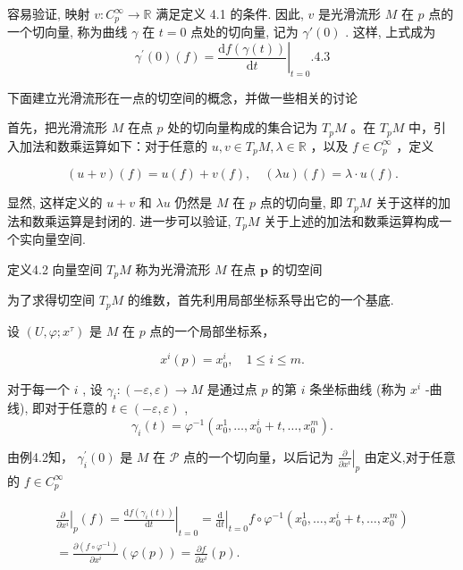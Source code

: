 容易验证, 映射  $v: C_p^\infty \to \mathbb{R}$  满足定义 4.1 的条件. 因此,  $v$  是光滑流形  $M$  在  $p$  点的一个切向量, 称为曲线  $\gamma$  在  $t = 0$  点处的切向量, 记为  $\gamma'(0)$ . 这样, 上式成为
$$
\gamma^ {\prime} (0) (f) = \left. \frac {\mathrm {d} f (\gamma (t))}{\mathrm {d} t} \right| _ {t = 0}. %
 {4.3}
$$

下面建立光滑流形在一点的切空间的概念，并做一些相关的讨论

首先，把光滑流形  $M$  在点  $p$  处的切向量构成的集合记为  $T_{p}M$ 。在  $T_{p}M$  中，引入加法和数乘运算如下：对于任意的  $u, v \in T_{p}M, \lambda \in \mathbb{R}$ ，以及  $f \in C_{p}^{\infty}$ ，定义

$$
(u + v) (f) = u (f) + v (f), \quad (\lambda u) (f) = \lambda \cdot u (f).
$$

显然, 这样定义的  $u + v$  和  $\lambda u$  仍然是  $M$  在  $p$  点的切向量, 即  $T_{p}M$  关于这样的加法和数乘运算是封闭的. 进一步可以验证,  $T_{p}M$  关于上述的加法和数乘运算构成一个实向量空间.

定义4.2 向量空间  $T_{p}M$  称为光滑流形  $M$  在点  $\pmb{p}$  的切空间

为了求得切空间  $T_{p}M$  的维数，首先利用局部坐标系导出它的一个基底.

设  $(U, \varphi; x^{\tau})$  是  $M$  在  $p$  点的一个局部坐标系，

$$
x ^ {i} (p) = x _ {0} ^ {i}, \quad 1 \leqslant i \leqslant m.
$$

对于每一个  $i$ , 设  $\gamma_i: (-\varepsilon, \varepsilon) \to M$  是通过点  $p$  的第  $i$  条坐标曲线 (称为  $x^i$ -曲线), 即对于任意的  $t \in (-\varepsilon, \varepsilon)$ ,
$$
\gamma_ {i} (t) = \varphi^ {- 1} \left(x _ {0} ^ {1}, \dots , x _ {0} ^ {i} + t, \dots , x _ {0} ^ {m}\right).
$$

由例4.2知，  $\gamma_i^{\prime}(0)$  是  $M$  在  $\mathcal{P}$  点的一个切向量，以后记为  $\left.\frac{\partial}{\partial x^i}\right|_p$  由定义,对于任意的  $f\in C_p^\infty$

$$
\begin{array}{l} \left. \frac {\partial}{\partial x ^ {i}} \right| _ {p} (f) = \left. \frac {\mathrm {d} f \left(\gamma_ {i} (t)\right)}{\mathrm {d} t} \right| _ {t = 0} = \left. \frac {\mathrm {d}}{\mathrm {d} t} \right| _ {t = 0} f \circ \varphi^ {- 1} \left(x _ {0} ^ {1}, \dots , x _ {0} ^ {i} + t, \dots , x _ {0} ^ {m}\right) \\ = \frac {\partial \left(f \circ \varphi^ {- 1}\right)}{\partial x ^ {i}} (\varphi (p)) = \frac {\partial f}{\partial x ^ {i}} (p). %
\\ \end{array}
$$

